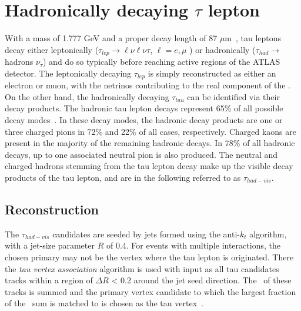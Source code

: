 \large

\section{Hadronically decaying $\tau$ lepton}
\label{sec:rec:tau}
With a mass of 1.777 GeV and a proper decay length
of 87 $\mu$m~\cite{PDG}, tau leptons decay either leptonically
($\tau_{lep} \rightarrow \ell \nu \ell \nu \tau$, $\ell  = e, \mu$ ) 
or hadronically ($\tau_{had} \rightarrow$ hadrons $\nu_{\tau}$) 
and do so typically before reaching active
regions of the \hbox{ATLAS} detector. 
The leptonically decaying $\tau_{lep}$ is simply reconstructed
as either an electron or muon, with the netrinos contributing 
to the real component of the \met. 
On the other hand, the hadronically decaying $\tau_{tau}$ 
can be identified via their decay products. 
The hadronic tau lepton decays represent 65\% of all possible decay modes~\cite{PDG}. 
In these decay modes, the hadronic decay products are 
one or three charged pions in 72\% and 22\% of all cases, respectively. 
Charged kaons are present in the 
majority of the remaining hadronic decays. 
In 78\% of all hadronic decays, up to one associated neutral pion is
also produced. The neutral and charged hadrons stemming from 
the tau lepton decay make up the visible
decay products of the tau lepton, 
and are in the following referred to as $\tau_{had-vis}$.
\subsection{Reconstruction}
The $\tau_{had-vis}$ candidates are
seeded by jets formed using the anti-$k_t$ algorithm,
with a jet-size parameter $R$ of 0.4. 
For events with multiple interactions, the chosen primary may not be the
vertex where the tau lepton is originated. 
There the \textit{tau vertex association} algorithm is used with 
input as all tau candidates tracks within a region of $\Delta R$ < 0.2 
around the jet seed direction. 
The \pt\ of these tracks is summed and the 
primary vertex candidate to which the largest fraction
of the \pt\ sum is matched to is chosen as the tau vertex~\cite{ATLAS-CONF-2014-018}.

